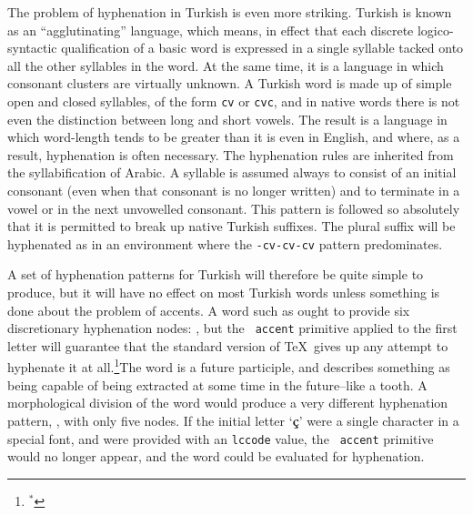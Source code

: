 The problem of hyphenation in Turkish is even more striking.  Turkish
is known as an ``agglutinating'' language, which means, in effect that
each discrete logico-syntactic qualification of a basic word is
expressed in a single syllable tacked onto all the other syllables in
the word.  At the same time, it is a language in which consonant
clusters are virtually unknown.  A Turkish word is made up of simple
open and closed syllables, of the form {\tt cv} or {\tt cvc}, and in
native words there is not even the distinction between long and short
vowels.  The result is a language in which word-length tends to be
greater than it is even in English, and where, as a result,
hyphenation is often necessary.  The hyphenation rules are inherited
from the syllabification of Arabic.  A syllable is assumed always to
consist of an initial consonant (even when that consonant is no longer
written) and to terminate in a vowel or in the next unvowelled
consonant.  This pattern is followed so absolutely that it is
permitted to break up native Turkish suffixes.  The plural suffix  will be hyphenated as  in an environment where
the {\tt -cv-cv-cv} pattern predominates.

A set of hyphenation patterns for Turkish will therefore be quite
simple to produce, but it will have no effect on most Turkish words
unless something is done about the problem of accents.  A word such as
 ought to provide six discretionary
hyphenation nodes: , but the {\tt\bs
accent} primitive applied to the first letter will guarantee that the
standard version of \TeX\ gives up any attempt to hyphenate it at 
all.\footnote{$^*$}{The word is a future participle, and describes 
something as being
capable of being extracted at some time in the future--like a tooth.
A morphological division of the word would produce a very different
hyphenation pattern, , with only five nodes.}
If the initial letter `{\bf \c c}' were a single character in a special
font, and were provided with an {\tt\bs lccode} value, the {\tt\bs
accent} primitive would no longer appear, and the word could be
evaluated for hyphenation.

